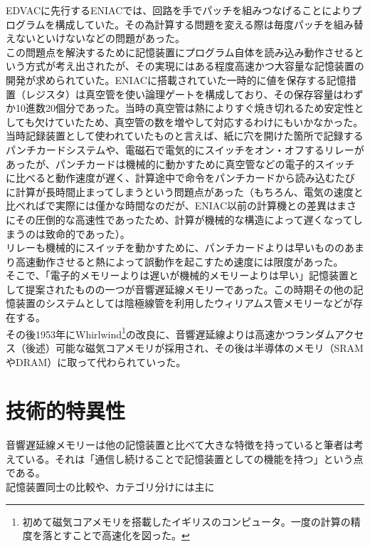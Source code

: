 \documentclass[a4paper,report]{jsbook}
\begin{document}
EDVACに先行するENIACでは、回路を手でパッチを組みつなげることによりプログラムを構成していた。その為計算する問題を変える際は毎度パッチを組み替えないといけないなどの問題があった。\\
この問題点を解決するために記憶装置にプログラム自体を読み込み動作させるという方式が考え出されたが、その実現にはある程度高速かつ大容量な記憶装置の開発が求められていた。ENIACに搭載されていた一時的に値を保存する記憶措置（レジスタ）は真空管を使い論理ゲートを構成しており、その保存容量はわずか10進数20個分であった。当時の真空管は熱によりすぐ焼き切れるため安定性としても欠けていたため、真空管の数を増やして対応するわけにもいかなかった。\\
当時記録装置として使われていたものと言えば、紙に穴を開けた箇所で記録するパンチカードシステムや、電磁石で電気的にスイッチをオン・オフするリレーがあったが、パンチカードは機械的に動かすために真空管などの電子的スイッチに比べると動作速度が遅く、計算途中で命令をパンチカードから読み込むたびに計算が長時間止まってしまうという問題点があった（もちろん、電気の速度と比べればで実際には僅かな時間なのだが、ENIAC以前の計算機との差異はまさにその圧倒的な高速性であったため、計算が機械的な構造によって遅くなってしまうのは致命的であった）。\\
リレーも機械的にスイッチを動かすために、パンチカードよりは早いもののあまり高速動作させると熱によって誤動作を起こすため速度には限度があった。\\
そこで、「電子的メモリーよりは遅いが機械的メモリーよりは早い」記憶装置として提案されたものの一つが音響遅延線メモリーであった。この時期その他の記憶装置のシステムとしては陰極線管を利用したウィリアムス管メモリーなどが存在する\autocite{invent_computer}。\\
その後1953年にWhirlwind\footnote{初めて磁気コアメモリを搭載したイギリスのコンピュータ。一度の計算の精度を落とすことで高速化を図った。}の改良に、音響遅延線よりは高速かつランダムアクセス（後述）可能な磁気コアメモリが採用され、その後は半導体のメモリ（SRAMやDRAM）に取って代わられていった。

\section{技術的特異性}\label{ux6280ux8853ux7684ux7279ux7570ux6027}

音響遅延線メモリーは他の記憶装置と比べて大きな特徴を持っていると筆者は考えている。それは「通信し続けることで記憶装置としての機能を持つ」という点である。\\
記憶装置同士の比較や、カテゴリ分けには主に
\end{document}
